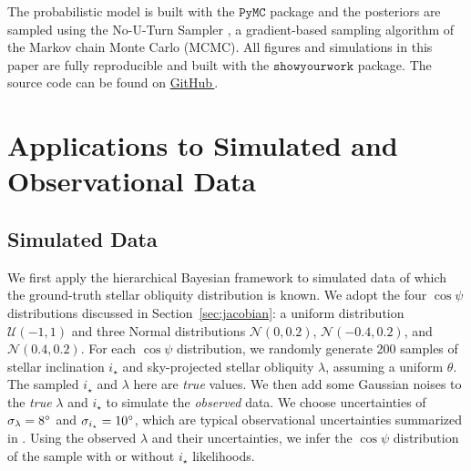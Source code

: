 \documentclass[twocolumn,times]{aastex631}
\begin{document}
The probabilistic model is built with the $\mathtt{PyMC}$ \citep[$\mathtt{v4.1.7}$;][]{pymc} package and the posteriors are sampled using the No-U-Turn Sampler \citep[NUTS;][]{Hoffman11}, a gradient-based sampling algorithm of the Markov chain Monte Carlo (MCMC). All figures and simulations in this paper are fully reproducible and built with the $\mathtt{showyourwork}$ package. The source code can be found on \href{https://github.com/jiayindong/polar}{GitHub\,\faGithub}.

\section{Applications to Simulated and Observational Data}\label{sec:applications}

\subsection{Simulated Data}

We first apply the hierarchical Bayesian framework to simulated data of which the ground-truth stellar obliquity distribution is known. We adopt the four $\cos{\psi}$ distributions discussed in Section~\ref{sec:jacobian}: a uniform distribution $\mathcal{U}(-1,1)$ and three Normal distributions $\mathcal{N}(0,0.2)$, $\mathcal{N}(-0.4,0.2)$, and $\mathcal{N}(0.4,0.2)$.
For each $\cos{\psi}$ distribution, we randomly generate 200 samples of stellar inclination $i_\star$ and sky-projected stellar obliquity $\lambda$, assuming a uniform $\theta$. The sampled $i_\star$ and $\lambda$ here are \emph{true} values. We then add some Gaussian noises to the \emph{true} $\lambda$ and $i_\star$ to simulate the \emph{observed} data. We choose uncertainties of $\sigma_{\lambda} = 8\mbox{$^\circ$}$ and $\sigma_{i_\star} = 10\mbox{$^\circ$}$, which are typical observational uncertainties summarized in \cite{Albrecht22}. Using the observed $\lambda$ and their uncertainties, we infer the $\cos{\psi}$ distribution of the sample with or without $i_\star$ likelihoods. 
\end{document}

